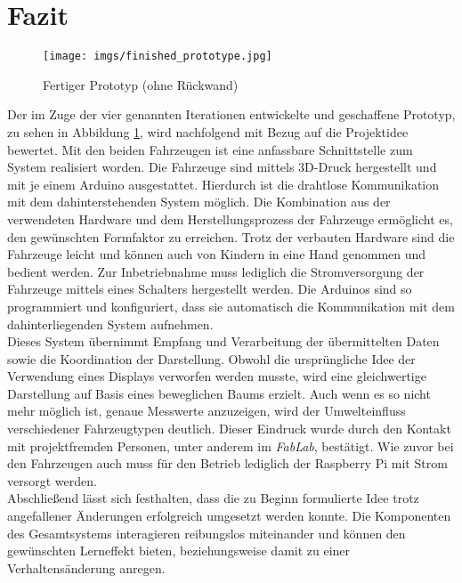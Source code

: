 \documentclass[.../Dokumentation.tex]{subfile}
\begin{document}
\section{Fazit}\label{sec-result}
\begin{figure}[H]
\begin{center}
    \texttt{[image: imgs/finished\_prototype.jpg]}
    \caption{Fertiger Prototyp (ohne Rückwand)}
    \label{fig-final-prototype}
\end{center}
\end{figure}
\noindent 
Der im Zuge der vier genannten Iterationen entwickelte und geschaffene Prototyp, 
zu sehen in Abbildung \ref{fig-final-prototype},  
wird nachfolgend mit Bezug auf die Projektidee bewertet. Mit den beiden 
Fahrzeugen ist eine anfassbare Schnittstelle zum System realisiert worden. Die 
Fahrzeuge sind mittels 3D-Druck hergestellt und mit je einem Arduino 
ausgestattet. Hierdurch ist die drahtlose Kommunikation mit dem 
dahinterstehenden System möglich. Die Kombination aus der verwendeten Hardware 
und dem Herstellungsprozess der Fahrzeuge ermöglicht es, den gewünschten 
Formfaktor zu erreichen. Trotz der verbauten Hardware sind die Fahrzeuge leicht 
und können auch von Kindern in eine Hand genommen und bedient werden. 
Zur Inbetriebnahme muss lediglich die Stromversorgung der Fahrzeuge mittels 
eines Schalters hergestellt werden. Die Arduinos sind so programmiert und 
konfiguriert, dass sie automatisch die Kommunikation mit dem dahinterliegenden 
System aufnehmen. \\
Dieses System übernimmt Empfang und Verarbeitung der übermittelten Daten sowie 
die Koordination der Darstellung. 
Obwohl die ursprüngliche Idee der Verwendung 
eines Displays verworfen werden musste, wird eine gleichwertige Darstellung auf 
Basis eines beweglichen Baums erzielt. Auch wenn es so nicht mehr möglich ist, 
genaue Messwerte anzuzeigen, wird der Umwelteinfluss verschiedener 
Fahrzeugtypen deutlich. Dieser Eindruck wurde durch den Kontakt mit 
projektfremden Personen, unter anderem im \emph{FabLab}, bestätigt. Wie zuvor 
bei den Fahrzeugen auch muss für den Betrieb lediglich der Raspberry Pi mit 
Strom versorgt werden.\\
Abschließend lässt sich festhalten, dass die zu Beginn formulierte Idee trotz 
angefallener Änderungen erfolgreich umgesetzt werden konnte. Die Komponenten 
des Gesamtsystems interagieren reibungslos miteinander und können den 
gewünschten Lerneffekt bieten, beziehungsweise damit zu einer 
Verhaltensänderung anregen.
\end{document}
